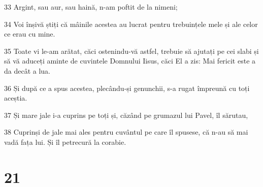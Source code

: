 \par 33 Argint, sau aur, sau haină, n-am poftit de la nimeni;
\par 34 Voi înșivă știți că mâinile acestea au lucrat pentru trebuințele mele și ale celor ce erau cu mine.
\par 35 Toate vi le-am arătat, căci ostenindu-vă astfel, trebuie să ajutați pe cei slabi și să vă aduceți aminte de cuvintele Domnului Iisus, căci El a zis: Mai fericit este a da decât a lua.
\par 36 Și după ce a spus acestea, plecându-și genunchii, s-a rugat împreună cu toți aceștia.
\par 37 Și mare jale i-a cuprins pe toți și, căzând pe grumazul lui Pavel, îl sărutau,
\par 38 Cuprinși de jale mai ales pentru cuvântul pe care îl spusese, că n-au să mai vadă fața lui. Și îl petrecură la corabie.

\chapter{21}

